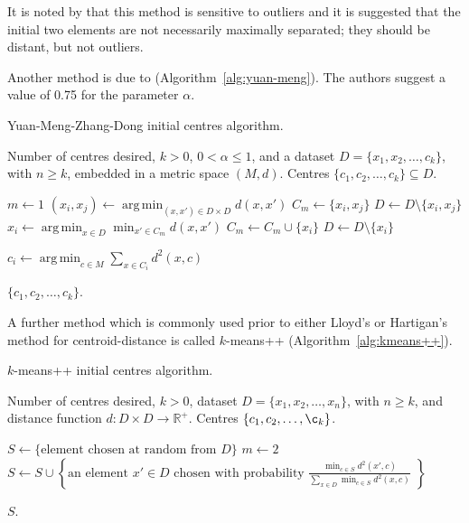 \documentclass[a4paper]{report}
\DeclareMathOperator*{\argmin}{arg\,min}
\newcommand{\dset}{D}
\begin{document}
It is noted by \citet{degroot1999selecting} that this method is sensitive to
outliers and it is suggested that the initial two elements are not necessarily
maximally separated; they should be distant, but not outliers.

Another method is due to \citet{yuan04initial}
(Algorithm~\ref{alg:yuan-meng}).  The authors suggest a value of 0.75 for the
parameter $\alpha$.

\begin{algorithm}
  \caption{Yuan-Meng-Zhang-Dong initial centres algorithm.}
  \label{alg:yuan-meng}

  \begin{algorithmic}
    \Require Number of centres desired, $k > 0$, $0 < \alpha \leq 1$, and a
             dataset $\dset = \{x_1,x_2,\dotsc,c_k\}$, with $n \geq k$,
             embedded in a metric space $(M,d)$.
    \Ensure Centres $\{c_1,c_2,\dotsc,c_k\} \subseteq \dset$.

    \State $m \gets 1$
       \State $\displaystyle (x_i,x_j) \gets
               \argmin_{(x,x') \in \dset \times \dset} d(x,x')$
       \State $C_m \gets \{x_i,x_j\}$
       \State $\dset \gets \dset \setminus \{x_i,x_j\}$
          \State $\displaystyle x_i \gets
                  \argmin_{x \in \dset} \min_{x' \in C_m} d(x,x')$
          \State $C_m \gets C_m \cup \{x_i\}$
          \State $\dset \gets \dset \setminus \{x_i\}$
       \EndWhile
    \EndWhile

       \State $\displaystyle c_i \gets
               \argmin_{c \in M} \sum_{x \in C_i} d^2(x,c)$
    \EndFor

    \State \Return $\{c_1,c_2,\dotsc,c_k\}$.
  \end{algorithmic}
\end{algorithm}

A further method which is commonly used prior to either Lloyd's or Hartigan's
method for centroid-distance is called $k$-means++
(Algorithm~\ref{alg:kmeans++}).

\begin{algorithm}
  \caption{$k$-means++ initial centres algorithm.}
  \label{alg:kmeans++}

  \begin{algorithmic}
    \Require Number of centres desired, $k > 0$, dataset $\dset =
             \{x_1,x_2,\dotsc,x_n\}$, with $n \geq k$, and distance function
             $d \colon \dset \times \dset \to \mathbb{R}^+$.
    \Ensure Centres $\{c_1,c_2,\dotsc,\c_k\}$.

    \State $S \gets \{\text{element chosen at random from $\dset$}\}$
    \State $m \gets 2$
       \State $\displaystyle S \gets S \cup
               \left\{\text{an element $x' \in \dset$ chosen with probability
                            $\frac{\displaystyle \min_{c \in S} d^2(x',c)}
                             {\displaystyle
                              \sum_{x \in \dset} \min_{c \in S} d^2(x,c)}$
                            }\right\}$
    \EndWhile

    \State \Return $S$.
  \end{algorithmic}
\end{algorithm}
\end{document}
